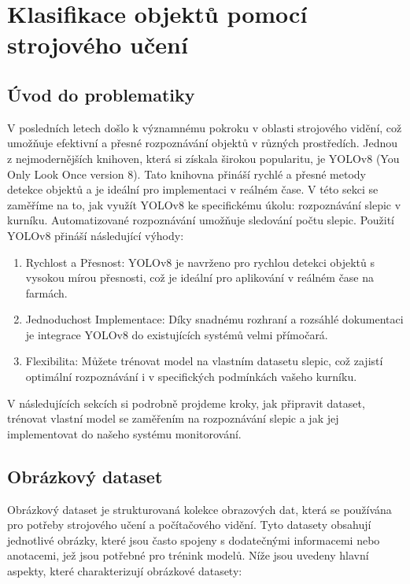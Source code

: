 \section{Klasifikace objektů pomocí strojového učení}\label{sec:klasifikace-objektu-pomoci-strojoveho-uceni}

\subsection*{Úvod do problematiky}\label{subsec:uvod-do-problematiky}
V posledních letech došlo k významnému pokroku v oblasti strojového vidění, což umožňuje efektivní a přesné rozpoznávání objektů v různých prostředích.
Jednou z nejmodernějších knihoven, která si získala širokou popularitu, je YOLOv8 (You Only Look Once version 8).
Tato knihovna přináší rychlé a přesné metody detekce objektů a je ideální pro implementaci v reálném čase.
V této sekci se zaměříme na to, jak využít YOLOv8 ke specifickému úkolu: rozpoznávání slepic v kurníku.
Automatizované rozpoznávání umožňuje sledování počtu slepic.
Použití YOLOv8 přináší následující výhody:

\begin{enumerate}
    \item Rychlost a Přesnost: YOLOv8 je navrženo pro rychlou detekci objektů s vysokou mírou přesnosti, což je ideální pro aplikování v reálném čase na farmách.
    \item Jednoduchost Implementace: Díky snadnému rozhraní a rozsáhlé dokumentaci je integrace YOLOv8 do existujících systémů velmi přímočará.
    \item Flexibilita: Můžete trénovat model na vlastním datasetu slepic, což zajistí optimální rozpoznávání i v specifických podmínkách vašeho kurníku.
\end{enumerate}
V následujících sekcích si podrobně projdeme kroky, jak připravit dataset, trénovat vlastní model se zaměřením na rozpoznávání slepic a jak jej implementovat do našeho systému monitorování.

\subsection*{Obrázkový dataset}\label{subsec:obrazkovy-dataset}

Obrázkový dataset je strukturovaná kolekce obrazových dat, která se používána pro potřeby strojového učení a počítačového vidění.
Tyto datasety obsahují jednotlivé obrázky, které jsou často spojeny s dodatečnými informacemi nebo anotacemi, jež jsou potřebné pro trénink modelů.
Níže jsou uvedeny hlavní aspekty, které charakterizují obrázkové datasety:

